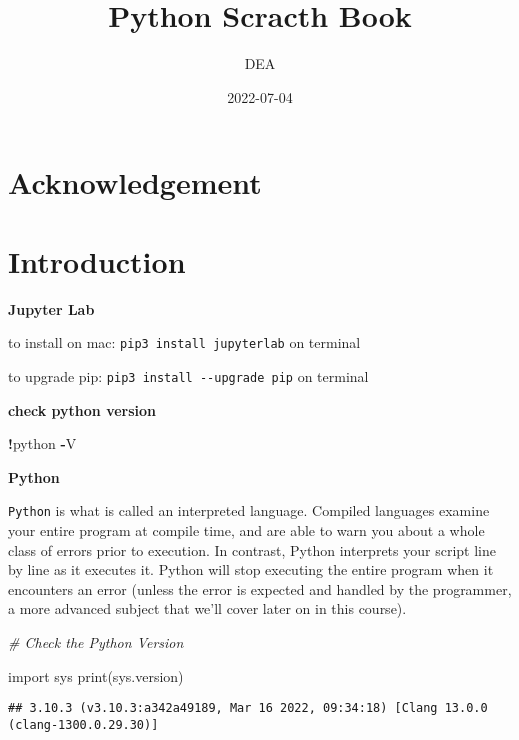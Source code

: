 \documentclass[
]{book}
\title{Python Scracth Book}
\author{DEA}
\date{2022-07-04}
\newenvironment{Shaded}{\begin{snugshade}}{\end{snugshade}}
\newcommand{\BuiltInTok}[1]{#1}
\newcommand{\CommentTok}[1]{\textcolor[rgb]{0.56,0.35,0.01}{\textit{#1}}}
\newcommand{\ImportTok}[1]{#1}
\newcommand{\NormalTok}[1]{#1}
\newcommand{\OperatorTok}[1]{\textcolor[rgb]{0.81,0.36,0.00}{\textbf{#1}}}
\begin{document}
\maketitle

{
\setcounter{tocdepth}{1}
\tableofcontents
}
\hypertarget{acknowledgement}{%
\chapter{Acknowledgement}\label{acknowledgement}}

\hypertarget{intro}{%
\chapter{Introduction}\label{intro}}

\textbf{Jupyter Lab}

to install on mac: \texttt{pip3\ install\ jupyterlab} on terminal

to upgrade pip: \texttt{pip3\ install\ -\/-upgrade\ pip} on terminal

\textbf{check python version}

\begin{Shaded}
\begin{Highlighting}[]
\OperatorTok{!}\NormalTok{python }\OperatorTok{{-}}\NormalTok{V}
\end{Highlighting}
\end{Shaded}

\textbf{Python}

\texttt{Python} is what is called an interpreted language. Compiled languages examine your entire program at compile time, and are able to warn you about a whole class of errors prior to execution. In contrast, Python interprets your script line by line as it executes it. Python will stop executing the entire program when it encounters an error (unless the error is expected and handled by the programmer, a more advanced subject that we'll cover later on in this course).

\begin{Shaded}
\begin{Highlighting}[]
\CommentTok{\# Check the Python Version}

\ImportTok{import}\NormalTok{ sys}
\BuiltInTok{print}\NormalTok{(sys.version)}
\end{Highlighting}
\end{Shaded}

\begin{verbatim}
## 3.10.3 (v3.10.3:a342a49189, Mar 16 2022, 09:34:18) [Clang 13.0.0 (clang-1300.0.29.30)]
\end{verbatim}
\end{document}
